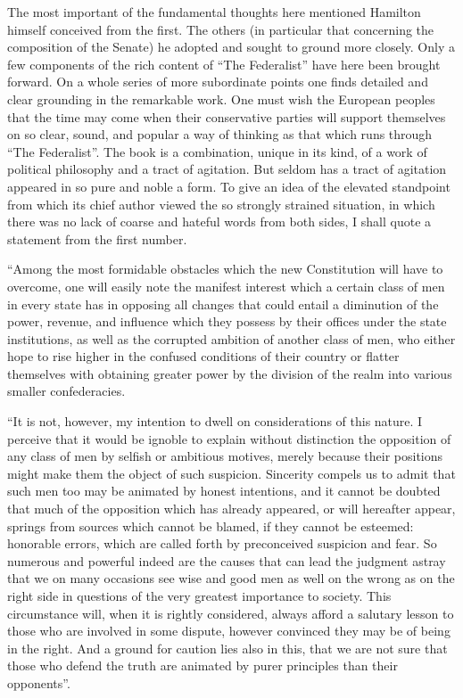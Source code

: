 \documentclass[12pt,a4paper,openany]{book}
\newcommand{\opage}[1]{\marginnote{\footnotesize\textit{[#1]}}}
\begin{document}
The most important of the fundamental thoughts here mentioned
Hamilton himself conceived from the first. The others (in particular that concerning the
composition of the Senate) he adopted and sought to ground
more closely. Only a few components of the rich content of ``The
Federalist'' have here been brought forward. On a whole series of more
subordinate points one finds detailed and clear grounding in
the remarkable work. One must wish the European
peoples that the time may come when their conservative parties
will support themselves on so clear, sound, and popular a way of thinking
as that which runs through ``The Federalist''. The book is a
combination, unique in its kind, of a work of political philosophy
and a tract of agitation. But seldom has a tract of agitation
appeared in so pure and noble a form. To give an
idea of the elevated standpoint from which its
chief author viewed the so strongly strained situation, in which
there was no lack of coarse and hateful words from
both sides, I shall quote a statement from the first
number.

``Among the most formidable obstacles which the new
Constitution will have to overcome, one will easily note the
manifest interest which a certain class of men in every
state has in opposing all changes that could
entail a diminution of the power, revenue, and influence
which they possess by their offices under the state institutions, as
\opage{139}well as the corrupted ambition of another class
of men, who either hope to rise higher in the confused
conditions of their country or flatter themselves with obtaining greater
power by the division of the realm into various smaller confederacies.

``It is not, however, my intention to dwell on
considerations of this nature. I perceive that it would be ignoble
to explain without distinction the opposition of any class
of men by selfish or ambitious motives,
merely because their positions might make them the object of
such suspicion. Sincerity compels us to admit
that such men too may be animated by honest
intentions, and it cannot be doubted that much of the
opposition which has already appeared, or will hereafter appear,
springs from sources which cannot be blamed, if they
cannot be esteemed: honorable errors, which are called forth
by preconceived suspicion and fear. So numerous and powerful
indeed are the causes that can lead the judgment astray that we on
many occasions see wise and good men as well on the
wrong as on the right side in questions of the very greatest
importance to society. This circumstance will, when
it is rightly considered, always afford a salutary lesson to those
who are involved in some dispute, however convinced
they may be of being in the right. And a ground for caution
lies also in this, that we are not sure that those who
defend the truth are animated by purer principles than their
opponents''.
\end{document}
